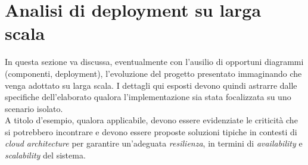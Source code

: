 \documentclass[12pt]{article}
\begin{document}

\newpage



\section{Analisi di deployment su larga scala}

In questa sezione va discussa, eventualmente con l'ausilio di opportuni diagrammi (componenti, deployment), l'evoluzione del progetto presentato immaginando che venga adottato su larga scala. I dettagli qui esposti devono quindi astrarre dalle specifiche dell'elaborato qualora l'implementazione sia stata focalizzata su uno scenario isolato.\\

A titolo d’esempio, qualora applicabile, devono essere evidenziate le criticità che si potrebbero incontrare e devono essere proposte soluzioni tipiche in contesti di \textit{cloud architecture} per garantire un'adeguata \textit{resilienza}, in termini di \textit{availability} e \textit{scalability} del sistema.\\
\end{document}
